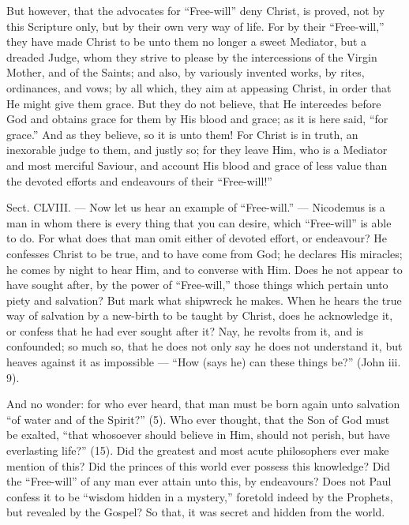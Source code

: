 But however, that the advocates for “Free-will” deny Christ, is proved, not by this Scripture only, but by their own very way of life. For by their “Free-will,” they have made Christ to be unto them no longer a sweet Mediator, but a dreaded Judge, whom they strive to please by the intercessions of the Virgin Mother, and of the Saints; and also, by variously invented works, by rites, ordinances, and vows; by all which, they aim at appeasing Christ, in order that He might give them grace. But they do not believe, that He intercedes before God and obtains grace for them by His blood and grace; as it is here said, “for grace.” And as they believe, so it is unto them! For Christ is in truth, an inexorable judge to them, and justly so; for they leave Him, who is a Mediator and most merciful Saviour, and account His blood and grace of less value than the devoted efforts and endeavours of their “Free-will!”


Sect. CLVIII. — Now let us hear an example of “Free-will.” — Nicodemus is a man in whom there is every thing that you can desire, which “Free-will” is able to do. For what does that man omit either of devoted effort, or endeavour? He confesses Christ to be true, and to have come from God; he declares His miracles; he comes by night to hear Him, and to converse with Him. Does he not appear to have sought after, by the power of “Free-will,” those things which pertain unto piety and salvation? But mark what shipwreck he makes. When he hears the true way of salvation by a new-birth to be taught by Christ, does he acknowledge it, or confess that he had ever sought after it? Nay, he revolts from it, and is confounded; so much so, that he does not only say he does not understand it, but heaves against it as impossible — “How (says he) can these things be?” (John iii. 9).

And no wonder: for who ever heard, that man must be born again unto salvation “of water and of the Spirit?” (5). Who ever thought, that the Son of God must be exalted, “that whosoever should believe in Him, should not perish, but have everlasting life?” (15). Did the greatest and most acute philosophers ever make mention of this? Did the princes of this world ever possess this knowledge? Did the “Free-will” of any man ever attain unto this, by endeavours? Does not Paul confess it to be “wisdom hidden in a mystery,” foretold indeed by the Prophets, but revealed by the Gospel? So that, it was secret and hidden from the world.

